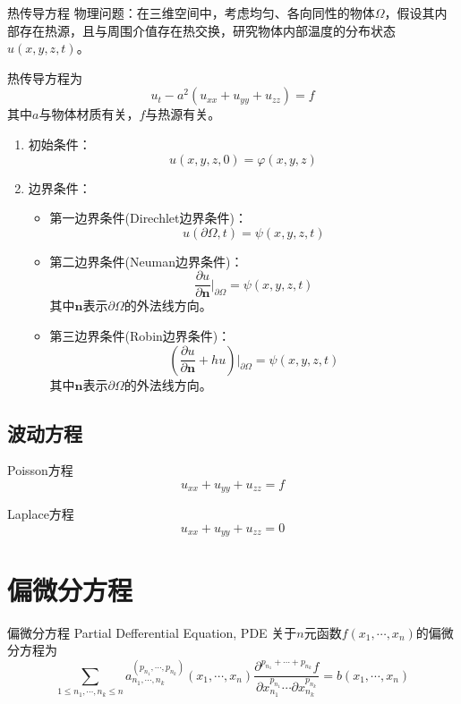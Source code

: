 \documentclass[lang = cn, scheme = chinese, thmcnt = section]{elegantbook}
\newcommand{\bs}{\boldsymbol}          %
\begin{document}
\begin{definition}{热传导方程}
	物理问题：在三维空间中，考虑均匀、各向同性的物体$\Omega$，假设其内部存在热源，且与周围介值存在热交换，研究物体内部温度的分布状态$u(x,y,z,t)$。
	
	热传导方程为
	$$
	u_t-a^2(u_{xx}+u_{yy}+u_{zz})=f
	$$
	其中$a$与物体材质有关，$f$与热源有关。
	
	\begin{enumerate}
		\item 初始条件：
		$$
		u(x,y,z,0)=\varphi(x,y,z)
		$$
		\item 边界条件：
		\begin{itemize}
			\item 第一边界条件(Direchlet边界条件)：
			$$
			u(\partial\Omega,t)=\psi(x,y,z,t)
			$$
			\item 第二边界条件(Neuman边界条件)：
			$$
			\frac{\partial u}{\partial \bs{n}} \bigg|_{\partial\Omega}=\psi(x,y,z,t)
			$$
			其中$\bs{n}$表示$\partial\Omega$的外法线方向。
			\item 第三边界条件(Robin边界条件)：
			$$
			\left(\frac{\partial u}{\partial \bs{n}}+hu\right)\bigg|_{\partial\Omega}=\psi(x,y,z,t)
			$$
			其中$\bs{n}$表示$\partial\Omega$的外法线方向。
		\end{itemize}
	\end{enumerate}
\end{definition}

\subsection{波动方程}

\begin{definition}{Poisson方程}
	$$
	u_{xx}+u_{yy}+u_{zz}=f
	$$
\end{definition}

\begin{definition}{Laplace方程}
	$$
	u_{xx}+u_{yy}+u_{zz}=0
	$$
\end{definition}

\section{偏微分方程}

\begin{definition}{偏微分方程 Partial Defferential Equation, PDE}
	关于$n$元函数$f(x_1,\cdots,x_n)$的偏微分方程为
	$$
	\sum_{1\le n_1,\cdots,n_k\le n} a_{n_1,\cdots,n_k}^{(p_{n_1},\cdots,p_{n_k})}(x_1,\cdots,x_n)\frac{\partial^{p_{n_1}+\cdots+p_{n_k}} f}{\partial x_{n_1}^{p_{n_1}}\cdots \partial x_{n_k}^{p_{n_k}}}=b(x_1,\cdots,x_n)
	$$
\end{definition}
\end{document}
